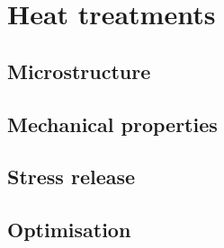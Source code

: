 \section{Heat treatments}
\subsection{Microstructure}

\subsection{Mechanical properties}

\subsection{Stress release}

\subsection{Optimisation}




